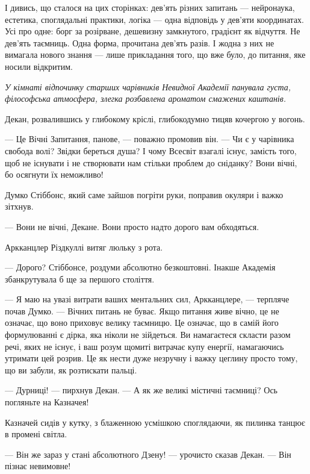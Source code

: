 \documentclass[12pt, a4paper, openany]{book}
\begin{document}
І дивись, що сталося на цих сторінках: дев'ять різних запитань --- нейронаука, естетика, споглядальні практики, логіка --- одна відповідь у дев'яти координатах. Усі про одне: борг за розірване, дешевизну замкнутого, градієнт як відчуття. Не дев'ять таємниць. Одна форма, прочитана дев'ять разів. І жодна з них не вимагала нового знання --- лише прикладання того, що вже було, до питання, яке носили відкритим.



\begin{terrybox}
\textit{У кімнаті відпочинку старших чарівників Невидної Академії панувала густа, філософська атмосфера, злегка розбавлена ароматом смажених каштанів.}

\medskip

Декан, розвалившись у глибокому кріслі, глибокодумно тицяв кочергою у вогонь.

--- Це Вічні Запитання, панове, --- поважно промовив він. --- Чи є у чарівника свобода волі? Звідки береться душа? І чому Всесвіт взагалі існує, замість того, щоб не існувати і не створювати нам стільки проблем до сніданку? Вони вічні, бо осягнути їх неможливо!

Думко Стіббонс, який саме зайшов погріти руки, поправив окуляри і важко зітхнув.

--- Вони не вічні, Декане. Вони просто надто дорого вам обходяться.

Аркканцлер Різдкуллі витяг люльку з рота.

--- Дорого? Стіббонсе, роздуми абсолютно безкоштовні. Інакше Академія збанкрутувала б ще за першого століття.

--- Я маю на увазі витрати ваших ментальних сил, Аркканцлере, --- терпляче почав Думко. --- Вічних питань не буває. Якщо питання живе вічно, це не означає, що воно приховує велику таємницю. Це означає, що в самій його формулюванні є дірка, яка ніколи не зійдеться. Ви намагаєтеся скласти разом речі, яких не існує, і ваш розум щомиті витрачає купу енергії, намагаючись утримати цей розрив. Це як нести дуже незручну і важку цеглину просто тому, що ви забули, як розтискати пальці.

--- Дурниці! --- пирхнув Декан. --- А як же великі містичні таємниці? Ось погляньте на Казначея!

Казначей сидів у кутку, з блаженною усмішкою споглядаючи, як пилинка танцює в промені світла.

--- Він же зараз у стані абсолютного Дзену! --- урочисто сказав Декан. --- Він пізнає невимовне!


\end{terrybox}
\end{document}
